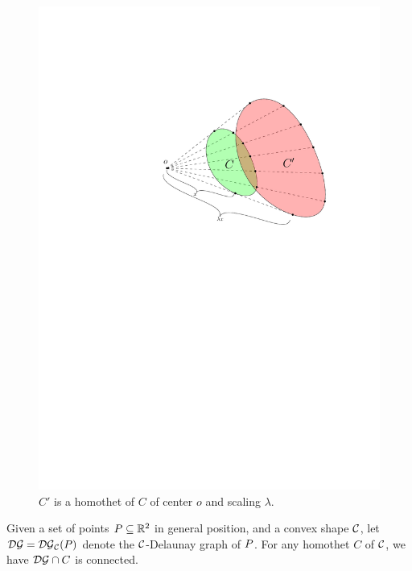 \documentclass[12pt]{article}%
\begin{document}
\begin{figure}[h]
    \centering%
    \includegraphics{figs/homothet}%
    \caption{$C'$ is a homothet of $C$ of center $o$ and scaling
       $\lambda$.}
\end{figure}


\begin{claim}
    Given a set of points $P \subseteq \mathbb{R}^2$ in general position,
    and a convex shape $\mathcal{C}$, let $\mathcal{DG} = \mathcal{DG}_{\mathcal{C}}(P)$ denote the
    $\mathcal{C}$-Delaunay graph of $P$. For any homothet $C$ of $\mathcal{C}$, we
    have $\mathcal{DG} \cap {C}$ is connected.

\end{claim}
\end{document}
